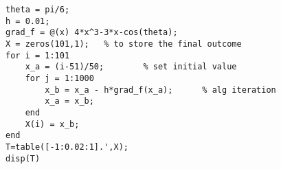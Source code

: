 \lstset{basicstyle=\footnotesize,style=myCustomMatlabStyle}
\begin{lstlisting}
theta = pi/6;
h = 0.01;
grad_f = @(x) 4*x^3-3*x-cos(theta);
X = zeros(101,1);   % to store the final outcome
for i = 1:101
    x_a = (i-51)/50;        % set initial value
    for j = 1:1000
        x_b = x_a - h*grad_f(x_a);      % alg iteration
        x_a = x_b;
    end
    X(i) = x_b;
end
T=table([-1:0.02:1].',X);
disp(T)
\end{lstlisting}
